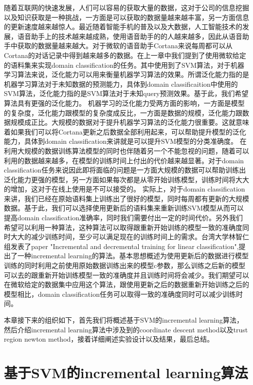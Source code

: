 \documentclass[master]{njuthesis}
\begin{document}
    随着互联网的快速发展，人们可以容易的获取大量的数据，这对于公司的信息挖掘以及知识获取是一种挑战，一方面是可以获取的数据量越来越丰富，另一方面信息的更新速度越来越惊人。最近随着智能手机的普及以及大数据，人工智能技术的发展，语音助手上的技术越来越成熟，使用语音助手的的人越来越多，因此从语音助手中获取的数据量越来越大。对于微软的语音助手Cortana来说每周都可以从Cortana的对话记录中得到越来越多的数据。在上一章中我们提到了使用微软给定的语料集来实现domain classification的任务。其中使用到了SVM算法，对于机器学习算法来说，泛化能力可以用来衡量机器学习算法的效果。所谓泛化能力指的是机器学习算法对于未知数据的预测能力，具体到domain classificaition中使用的SVM算法，泛化能力指的是SVM算法对于未知query预测效果。基于此，我们希望算法具有更强的泛化能力。
    机器学习的泛化能力受两方面的影响，一方面是模型的复杂度，泛化能力跟模型的复杂度成反比，一方面是数据的规模，泛化能力跟数据规模成正比。大规模的数据对于提升机器学习算法的泛化能力很重要。这就意味着如果我们可以将Cortana更新之后数据全部利用起来，可以帮助提升模型的泛化能力，具体到domain classification来讲就是可以提升SVM模型的分类准确度。
    在利用大规模的数据训练算法模型的同时也伴随着另一个不能忽视的问题，随着可以利用的数据越来越多，在模型的训练时间上付出的代价越来越显著。对于domain classification任务来说因此即将面临的问题是一方面大规模的数据可以帮助训练出泛化能力更强的模型，另一方面如果每次都是从零开始训练模型，训练时间将大大的增加，这对于在线上使用是不可以接受的。
    实际上，对于domain classification来讲，我们已经在原始语料集上训练出了很好的模型，同时每周都有更新的大规模数据。基于此，我们可以选择使用更新后的语料集来重新训练SVM模型从而可以提高domain classification准确率，同时我们需要付出一定的时间代价。另外我们希望可以利用一种算法，这种算法可以取得跟重新开始训练的模型一致的准确度同时大大的减少训练时间，至少可以满足现在的训练时间上的需求。台湾大学林智仁组发表了paper "Incremental and decremental training for linear classification",提出了一种incremental learning的算法。基本思想概述为使用更新后的数据进行模型训练的同时利用之前使用原始数据训练出来的模型c参数，那么训练之后新的模型可以去的跟重新开始训练模型一致的准确度并且训练时间将会减少。我们期望可以在微软给定的数据集中应用这个算法，跟使用更新之后的数据重新开始训练之后的模型相比，domain classification任务可以取得一致的准确度同时可以减少训练时间。

    本章接下来的组织如下，首先我们将概述基于SVM的incremental learning算法，然后介绍incremental learning算法中涉及到的coordinate descent method以及trust region newton method，接着详细阐述实验设计以及结果，最后总结。

\section{基于SVM的incremental learning算法}
\end{document}

